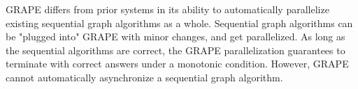 
GRAPE \cite{Fan:2017:PSG:3035918.3035942} differs from prior systems in its ability to automatically parallelize existing sequential graph algorithms as a whole. Sequential graph algorithms can be "plugged into" GRAPE with minor changes, and get parallelized. As long as the sequential algorithms are correct, the GRAPE parallelization guarantees to terminate with correct answers under a monotonic condition. However, GRAPE cannot automatically asynchronize a sequential graph algorithm.

